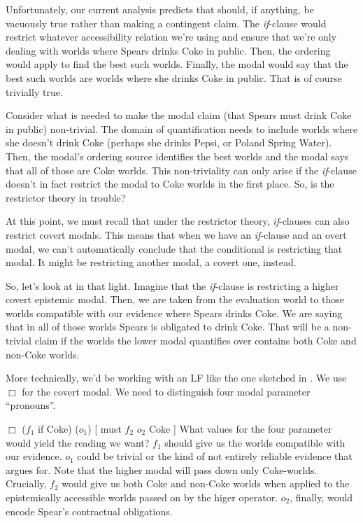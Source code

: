 Unfortunately, our current analysis predicts that \Last should, if anything, be
vacuously true rather than making a contingent claim. The \emph{if}-clause would
restrict whatever accessibility relation we're using and ensure that we're only
dealing with worlds where Spears drinks Coke in public. Then, the ordering would
apply to find the best such worlds. Finally, the modal would say that the best
such worlds are worlds where she drinks Coke in public. That is of course
trivially true.

Consider what is needed to make the modal claim (that Spears must drink Coke in
public) non-trivial. The domain of quantification needs to include worlds where
she doesn't drink Coke (perhaps she drinks Pepsi, or Poland Spring Water). Then,
the modal's ordering source identifies the best worlds and the modal says that
all of those are Coke worlds. This non-triviality can only arise if the
\emph{if}-clause doesn't in fact restrict the modal to Coke worlds in the first
place. So, is the restrictor theory in trouble?

At this point, we must recall that under the restrictor theory,
\emph{if}-clauses can also restrict covert modals. This means that when we have
an \emph{if}-clause and an overt modal, we can't automatically conclude that the
conditional is restricting that modal. It might be restricting another
modal, a covert one, instead.

So, let's look at \Last in that light. Imagine that the \emph{if}-clause is
restricting a higher covert epistemic modal. Then, we are taken from the
evaluation world to those worlds compatible with our evidence where Spears
drinks Coke. We are saying that in all of those worlds Spears is obligated to
drink Coke. That will be a non-trivial claim if the worlds the lower modal
quantifies over contains both Coke and non-Coke worlds.

More technically, we'd be working with an LF like the one sketched in \Next. We
use $\Box$ for the covert modal. We need to distinguish four modal parameter
``pronouns''.

\ex
$\Box$ ($f_{1}$ if Coke) ($o_{1}$) [ must $f_{2}$ $o_{2}$ Coke ]
\xe
%
What values for the four parameter would yield the reading we want? $f_{1}$
should give us the worlds compatible with our evidence. $o_{1}$ could be trivial
or the kind of not entirely reliable evidence that \cite{kratzer-1991-modality}
argues for. Note that the higher modal will pass down only Coke-worlds.
Crucially, $f_{2}$ would give us both Coke and non-Coke worlds when applied to
the epistemically accessible worlds passed on by the higer operator. $o_{2}$,
finally, would encode Spear's contractual obligations.

